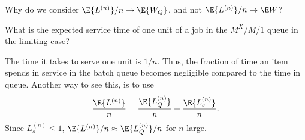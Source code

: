 \begin{exercise}
  Why do we consider $\E{L^{(n)}}/n \to \E{W_Q}$, and not
  $\E{L^{(n)}}/n \to \E W$? 
  \begin{hint}
What is the expected service time of one
  unit of a job in the $M^X/M/1$ queue in the limiting case?
  \end{hint}
  \begin{solution}
    The time it takes to serve one unit is $1/n$. Thus, the fraction
    of time an item spends in service in the batch queue becomes negligible compared
    to the time in queue. Another way to see this, is to use 
    \begin{equation*}
      \frac{\E{L^{(n)}}}n = 
      \frac{\E{L^{(n)}_Q}}n + \frac{\E{L^{(n)}_s}}n.
    \end{equation*}
Since $L^{(n)}_s \leq 1$, $\E{L^{(n)}}/n \approx \E{L^{(n)}_Q}/n$ for $n$ large.
  \end{solution}
\end{exercise}

\begin{comment}
  
\begin{exercise}[use=false]
Can you model the $M^X/M/1$ as an $M/G/1$ queue, thereby deriving Eq.~(\ref{eq:43}) from Eq.~(\ref{eq:710})? 
  \begin{solution}
I guess this is a bit hard, so I include a partial answer for the interested. 


Starting from the $M/G/1$ queue, suppose first that the service time
$S$ is an exponential random variable with mean $1/\mu$.  Then the
$M/G/1$ reduces to the $M/M/1$ queue, which is evidently equal to
the $M^1/M/1$ queue in which the jobs arrive as single units. Next, if
$S$ consists of the sum of $k$ i.i.d. exponential random variables
$S_i$ with mean $1/\mu$, i.e., $S=\sum_{i=1}^k S_i$, then the
$M^k/M/1$ queue results. Generalizing still further, we can take a
random batch $B$ of i.i.d. exponentials so that $S = \sum_{i=1}^B S_i$. Now
\begin{equation*}
  \P{S\leq x}
= \sum_{k=1}^\infty \P{S \leq x\given B=k}\P{B=k}
= \sum_{k=1}^\infty f(k) \P{\sum_{i=1}^B X_i \leq x}
\end{equation*}
where $f(k)=\P{B=k}$, and we obtain the $M^X/M/1$ from the $M/G/1$
queue by taking this distribution function for the service times.
  \end{solution}
\end{exercise}
\end{comment}


